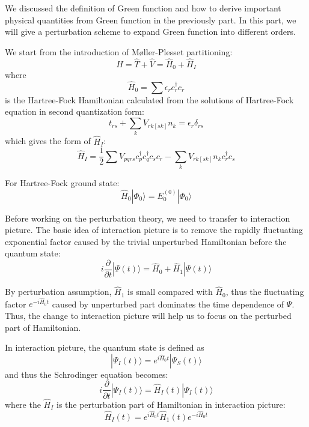 We discussed the definition of Green function and how to derive important physical quantities from Green function in the previously part.
In this part, we will give a perturbation scheme to expand Green function into different orders.

We start from the introduction of M{\o}ller-Plesset partitioning:
\begin{equation}
\hat{H}=\hat{T}+\hat{V}=\hat{H}_{0}+\hat{H}_{I}
\end{equation}
where
\begin{equation}
\hat{H}_{0}=\sum \epsilon_{r} c_{r}^{\dagger} c_{r}
\end{equation}
is the Hartree-Fock Hamiltonian calculated from the solutions of Hartree-Fock equation in second quantization form:
\begin{equation}
t_{r s}+\sum_{k} V_{r k[s k]} n_{k}=\epsilon_{r} \delta_{r s}
\end{equation}
which gives the form of $\hat{H}_I$:
\begin{equation}
\hat{H}_I=\frac{1}{2} \sum V_{p q r s} c_{p}^{\dagger} c_{q}^{\dagger} c_{s} c_{r}-\sum_{k} V_{r k[s k]} n_{k} c_{r}^{\dagger} c_{s}
\end{equation}

For Hartree-Fock ground state:
\begin{equation}
\hat{H}_{0} | \Phi_{0} \rangle=E_{0}^{(0)} | \Phi_{0} \rangle
\end{equation}

Before working on the perturbation theory, we need to transfer to interaction picture.
The basic idea of interaction picture is to remove the rapidly fluctuating exponential factor caused by the trivial unperturbed Hamiltonian before the quantum state:
\begin{equation}
i \frac{\partial}{\partial t} | \Psi(t) \rangle=\hat{H}_{0}+\hat{H}_{1} | \Psi(t) \rangle
\end{equation}

By perturbation assumption, $\hat{H}_1$ is small compared with $\hat{H}_0$, thus the fluctuating factor $e^{-i \hat{H}_0 t}$ caused by unperturbed part dominates the time dependence of $\Psi$.
Thus, the change to interaction picture will help us to focus on the perturbed part of Hamiltonian.

In interaction picture, the quantum state is defined as
\begin{equation}
| \Psi_{I}(t) \rangle=e^{i \hat{H}_{0} t} | \Psi_{S}(t) \rangle
\end{equation}
and thus the Schrodinger equation becomes:
\begin{equation}
i \frac{\partial}{\partial t} | \Psi_{I}(t) \rangle=\hat{H}_{I}(t) | \Psi_{I}(t) \rangle
\end{equation}
where the $\hat{H}_I$ is the perturbation part of Hamiltonian in interaction picture:
\begin{equation}
\hat{H}_{I}(t)=e^{i \hat{H}_{0} t} \hat{H}_{1}(t) e^{-i \hat{H}_{0} t}
\end{equation}

